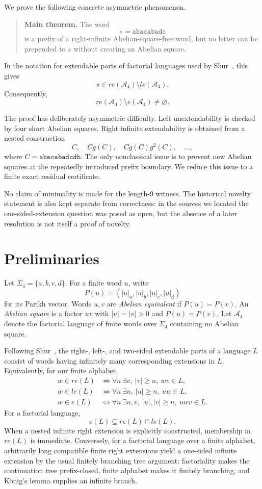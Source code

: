 \documentclass[11pt]{article}
\theoremstyle{definition}
\newcommand{\A}{\mathcal A_4}
\newcommand{\Par}{P}
\newcommand{\code}[1]{\texttt{#1}}
\begin{document}
We prove the following concrete asymmetric phenomenon.

\begin{quote}
\textbf{Main theorem.} The word
\[
s=\code{abacabadc}
\]
is a prefix of a right-infinite Abelian-square-free word, but no letter can be prepended to $s$ without creating an Abelian square.
\end{quote}

In the notation for extendable parts of factorial languages used by Shur~\cite{Shur2008}, this gives
\[
\boxed{s\in re(\A)\setminus le(\A)}.
\]
Consequently,
\[
\boxed{re(\A)\setminus e(\A)\neq\varnothing}.
\]

The proof has deliberately asymmetric difficulty. Left unextendability is checked by four short Abelian squares. Right infinite extendability is obtained from a nested construction
\[
C,\quad Cg(C),\quad Cg(C)g^2(C),\quad\ldots,
\]
where $C=\code{abacabadcdb}$. The only nonclassical issue is to prevent new Abelian squares at the repeatedly introduced prefix boundary. We reduce this issue to a finite exact residual certificate.

No claim of minimality is made for the length-9 witness. The historical novelty statement is also kept separate from correctness: in the sources we located the one-sided-extension question was posed as open, but the absence of a later resolution is not itself a proof of novelty.

\section{Preliminaries}

Let $\Sigma_4=\{a,b,c,d\}$. For a finite word $u$, write
\[
\Par(u)=(|u|_a,|u|_b,|u|_c,|u|_d)
\]
for its Parikh vector. Words $u,v$ are \emph{Abelian equivalent} if $\Par(u)=\Par(v)$. An \emph{Abelian square} is a factor $uv$ with $|u|=|v|>0$ and $\Par(u)=\Par(v)$. Let $\A$ denote the factorial language of finite words over $\Sigma_4$ containing no Abelian square.

Following Shur~\cite{Shur2008}, the right-, left-, and two-sided extendable parts of a language $L$ consist of words having infinitely many corresponding extensions in $L$. Equivalently, for our finite alphabet,
\begin{align*}
w\in re(L)&\iff \forall n\ \exists v,\ |v|\ge n,\ wv\in L,\\
w\in le(L)&\iff \forall n\ \exists u,\ |u|\ge n,\ uw\in L,\\
w\in e(L)&\iff \forall n\ \exists u,v,\ |u|,|v|\ge n,\ uwv\in L.
\end{align*}
For a factorial language,
\[
e(L)\subseteq re(L)\cap le(L).
\]
When a nested infinite right extension is explicitly constructed, membership in $re(L)$ is immediate. Conversely, for a factorial language over a finite alphabet, arbitrarily long compatible finite right extensions yield a one-sided infinite extension by the usual finitely branching tree argument: factoriality makes the continuation tree prefix-closed, finite alphabet makes it finitely branching, and K\"onig's lemma supplies an infinite branch.
\end{document}
